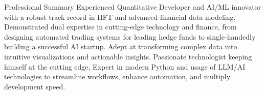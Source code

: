 \begin{rubric}{Professional Summary}
\entry*[]%
Experienced Quantitative Developer and AI/ML innovator with a robust track record in HFT and advanced financial data modeling. Demonstrated dual expertise in cutting-edge technology and finance, from designing automated trading systems for leading hedge funds to single-handedly building a successful AI startup. Adept at transforming complex data into intuitive visualizations and actionable insights. 
\entry*[]%
Passionate technologist keeping himself at the cutting edge, Expert in modern Python and usage of LLM/AI technologies to streamline workflows, enhance automation, and multiply development speed.
\end{rubric}
